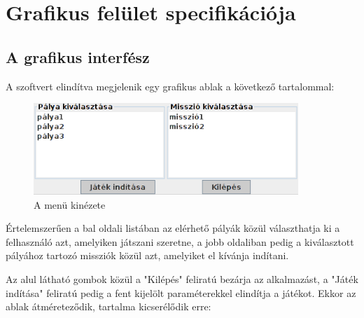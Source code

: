 %
\chapter{Grafikus felület specifikációja}

\thispagestyle{fancy}

\section{A grafikus interfész}
A szoftvert elindítva megjelenik egy grafikus ablak a következő tartalommal:

\begin{figure}[H]
\begin{center}
\includegraphics[width=10cm]{images/ch11/screenshot_menu.png}
\caption{A menü kinézete}
\label{fig:screenshot_menu}
\end{center}
\end{figure}

Értelemszerűen a bal oldali listában az elérhető pályák közül választhatja ki a felhasználó azt, amelyiken játszani szeretne, a jobb oldaliban pedig a kiválasztott pályához tartozó missziók közül azt, amelyiket el kívánja indítani.

Az alul látható gombok közül a "Kilépés" feliratú bezárja az alkalmazást, a "Játék indítása" feliratú pedig a fent kijelölt paraméterekkel elindítja a játékot. Ekkor az ablak átméreteződik, tartalma kicserélődik erre:

